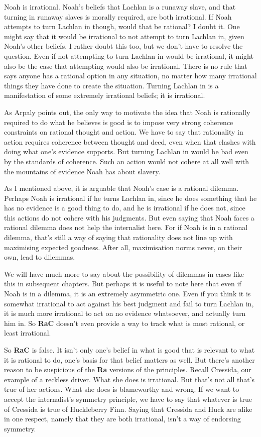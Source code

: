 \documentclass[
  10pt,
  letterpaper,
  twoside]{scrbook}
\begin{document}
{Noah} is irrational. {Noah}'s beliefs that {Lachlan} is a runaway
slave, and that turning in runaway slaves is morally required, are both
irrational. If {Noah} attempts to turn {Lachlan} in though, would that
be rational? I doubt it. One might say that it would be irrational to
not attempt to turn {Lachlan} in, given {Noah}'s other beliefs. I rather
doubt this too, but we don't have to resolve the question. Even if not
attempting to turn {Lachlan} in would be irrational, it might also be
the case that attempting would also be irrational. There is no rule that
says anyone has a rational option in any situation, no matter how many
irrational things they have done to create the situation. Turning
{Lachlan} in is a manifestation of some extremely irrational beliefs; it
is irrational.

As Arpaly points out, the only way to motivate the idea that {Noah} is
rationally required to do what he believes is good is to impose very
strong coherence constraints on rational thought and action. We have to
say that rationality in action requires coherence between thought and
deed, even when that clashes with doing what one's evidence supports.
But turning {Lachlan} in would be bad even by the standards of
coherence. Such an action would not cohere at all well with the
mountains of evidence {Noah} has about slavery.

As I mentioned above, it is arguable that {Noah}'s case is a rational
dilemma. Perhaps {Noah} is irrational if he turns {Lachlan} in, since he
does something that he has no evidence is a good thing to do, and he is
irrational if he does not, since this actions do not cohere with his
judgments. But even saying that {Noah} faces a rational dilemma does not
help the internalist here. For if {Noah} is in a rational dilemma,
that's still a way of saying that rationality does not line up with
maximising expected goodness. After all, maximisation norms never, on
their own, lead to dilemmas.

We will have much more to say about the possibility of dilemmas in cases
like this in subsequent chapters. But perhaps it is useful to note here
that even if {Noah} is in a dilemma, it is an extremely asymmetric one.
Even if you think it is somewhat irrational to act against his best
judgment and fail to turn {Lachlan} in, it is much more irrational to
act on no evidence whatsoever, and actually turn him in. So \textbf{RaC}
doesn't even provide a way to track what is most rational, or least
irrational.

So \textbf{RaC} is false. It isn't only one's belief in what is good
that is relevant to what it is rational to do, one's basis for that
belief matters as well. But there's another reason to be suspicious of
the \textbf{Ra} versions of the principles. Recall {Cressida}, our
example of a reckless driver. What she does is irrational. But that's
not all that's true of her actions. What she does is blameworthy and
wrong. If we want to accept the internalist's symmetry principle, we
have to say that whatever is true of {Cressida} is true of {Huck}leberry
Finn. Saying that {Cressida} and {Huck} are alike in one respect, namely
that they are both irrational, isn't a way of endorsing symmetry.
\end{document}
